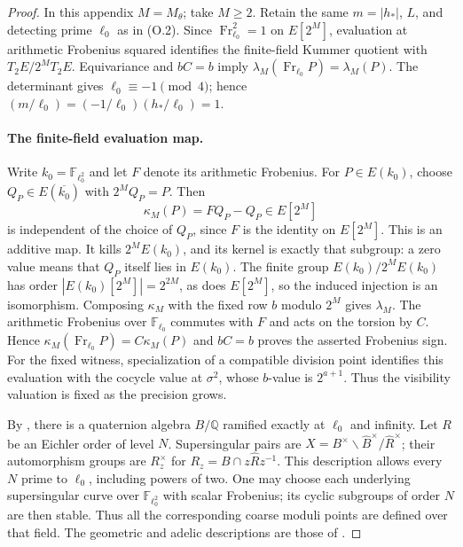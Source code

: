 \begin{proof}\leavevmode
In this appendix $M=M_\theta$; take $M\geq2$.  Retain the
same $m=|h_*|$, $L$, and detecting prime $\ell_0$ as in (O.2).
Since $\operatorname{Fr}_{\ell_0}^2=1$ on $E[2^M]$, evaluation at
arithmetic Frobenius squared identifies the finite-field Kummer
quotient with $T_2E/2^M T_2E$.  Equivariance and $bC=b$ imply
$\lambda_M(\operatorname{Fr}_{\ell_0} P)=\lambda_M(P)$.
The determinant gives $\ell_0\equiv-1\pmod4$; hence
$(m/\ell_0)=(-1/\ell_0)(h_*/\ell_0)=1$.
\paragraph{The finite-field evaluation map.}
Write $k_0=\mathbb F_{\ell_0^2}$ and let $F$ denote its arithmetic
Frobenius. For $P\in E(k_0)$, choose $Q_P\in E(\overline{k_0})$
with $2^M Q_P=P$. Then
\[
 \kappa_M(P)=FQ_P-Q_P\in E[2^M]
\]
is independent of the choice of $Q_P$, since $F$ is the identity
on $E[2^M]$. This is an additive map. It kills $2^ME(k_0)$,
and its kernel is exactly that subgroup: a zero value means that
$Q_P$ itself lies in $E(k_0)$. The finite group
$E(k_0)/2^ME(k_0)$ has order $|E(k_0)[2^M]|=2^{2M}$, as does
$E[2^M]$, so the induced injection is an isomorphism.
Composing $\kappa_M$ with the fixed row $b$ modulo $2^M$ gives
$\lambda_M$. The arithmetic Frobenius over $\mathbb F_{\ell_0}$
commutes with $F$ and acts on the torsion by $C$. Hence
$\kappa_M(\operatorname{Fr}_{\ell_0}P)=C\kappa_M(P)$ and
$bC=b$ proves the asserted Frobenius sign.
For the fixed witness, specialization of a compatible division
point identifies this evaluation with the cocycle value at
$\sigma^2$, whose $b$-value is $2^{a+1}$. Thus the visibility
valuation is fixed as the precision grows.

By \cite[Main Theorem 14.6.1]{voight-quaternion}, there is a quaternion
algebra $B/\mathbb Q$ ramified exactly at $\ell_0$ and infinity.
Let $R$ be an Eichler
order of level $N$.  Supersingular pairs are
$X=B^\times\backslash\widehat B^\times/\widehat R^\times$;
their automorphism groups are $R_z^\times$ for
$R_z=B\cap z\widehat Rz^{-1}$.  This description allows every
$N$ prime to $\ell_0$, including powers of two.  One may choose each
underlying supersingular curve over $\mathbb F_{\ell_0^2}$ with scalar
Frobenius; its cyclic subgroups of order $N$ are then stable.  Thus
all the corresponding coarse moduli points are defined over that
field.  The geometric and adelic descriptions are those of
\cite[Sections 1.1--1.2 and 2.5]{jetchevkane}.


\end{proof}
